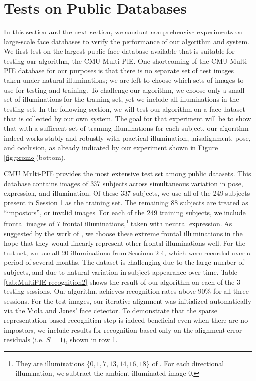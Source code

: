 \documentclass[10pt,journal,letterpaper,compsoc]{IEEEtran}
\begin{document}
\section{Tests on Public Databases}\label{sec:multipie}
In this section and the next section, we conduct comprehensive experiments on
large-scale face databases to verify the performance of our algorithm and
system. We first test on the largest public face database available that is
suitable for testing our algorithm, the CMU Multi-PIE.  One shortcoming of the
CMU Multi-PIE database for our purposes is that there is no separate set of
test images taken under natural illuminations; we are left to choose which sets
of images to use for testing and training.  To challenge our algorithm, we
choose only a small set of illuminations for the training set, yet we include
all illuminations in the testing set. In the following section, we will test
our algorithm on a face dataset that is collected by our own system. The goal
for that experiment will be to show that with a sufficient set of training
illuminations for each subject, our algorithm indeed works stably and robustly
with practical illumination, misalignment, pose, and occlusion, as already
indicated by our experiment shown in Figure \ref{fig:promo}(bottom).

CMU Multi-PIE provides the most extensive test set among public
datasets. This database contains images of 337 subjects across
simultaneous variation in pose, expression, and illumination.
Of these 337 subjects, we use all of the 249 subjects present
in Session 1 as the training set. The remaining 88 subjects are
treated as ``impostors'', or invalid images. For each of the
249 training subjects, we include frontal images of 7 frontal
illuminations,\footnote{They are illuminations
$\{0,1,7,13,14,16,18\}$ of \cite{Gross2008-FGR}. For each
directional illumination, we subtract the ambient-illuminated
image 0.} taken with neutral expression. As suggested by the
work of \cite{Georghiades2001-PAMI}, we choose these extreme
frontal illuminations in the hope that they would linearly
represent other frontal illuminations well. For the test set,
we use all 20 illuminations from Sessions 2-4, which were
recorded over a period of several months. The dataset is
challenging due to the large number of subjects, and due to
natural variation in subject appearance over time.
Table \ref{tab:MultiPIE-recognition2} shows the result of our
algorithm on each of the 3 testing sessions. Our algorithm
achieves recognition rates above $90\%$ for all three sessions.
For the test images, our iterative alignment was initialized
automatically via the Viola and Jones' face detector. To
demonstrate that the sparse representation based recognition
step is indeed beneficial even when there are no impostors, we
include results for recognition based only on the alignment
error residuals (i.e. $S=1$), shown in row 1.
\end{document}
